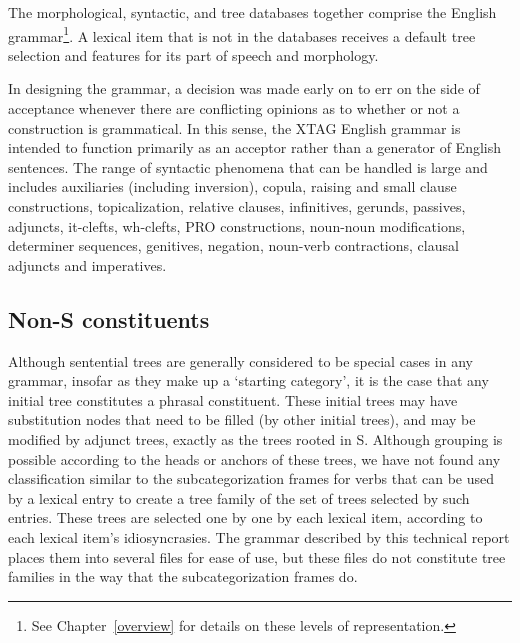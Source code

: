 The morphological, syntactic, and tree databases together comprise the
English grammar\footnote{ See Chapter~\ref{overview} for details on
these levels of representation. }.  A lexical item that is not in the
databases receives a default tree selection and features for its part
of speech and morphology.  

In designing the grammar, a decision was made early on to err on the
side of acceptance whenever there are conflicting opinions as to
whether or not a construction is grammatical.  In this sense, the XTAG
English grammar is intended to function primarily as an acceptor
rather than a generator of English sentences.  The range of syntactic
phenomena that can be handled is large and includes auxiliaries
(including inversion), copula, raising and small clause constructions,
topicalization, relative clauses, infinitives, gerunds, passives,
adjuncts, it-clefts, wh-clefts, PRO constructions, noun-noun
modifications, determiner sequences, genitives, negation, noun-verb
contractions, clausal adjuncts and imperatives.

\subsection{Non-S constituents}

Although sentential trees are generally considered to be special cases
in any grammar, insofar as they make up a `starting category', it is
the case that any initial tree constitutes a phrasal constituent.
These initial trees may have substitution nodes that need to be filled
(by other initial trees), and may be modified by adjunct trees,
exactly as the trees rooted in S.  Although grouping is possible
according to the heads or anchors of these trees, we have not found
any classification similar to the subcategorization frames for verbs
that can be used by a lexical entry to create a tree family of the set
of trees selected by such entries.  These trees are selected one by
one by each lexical item, according to each lexical item's
idiosyncrasies.  The grammar described by this technical report places
them into several files for ease of use, but these files do not
constitute tree families in the way that the subcategorization frames
do.








